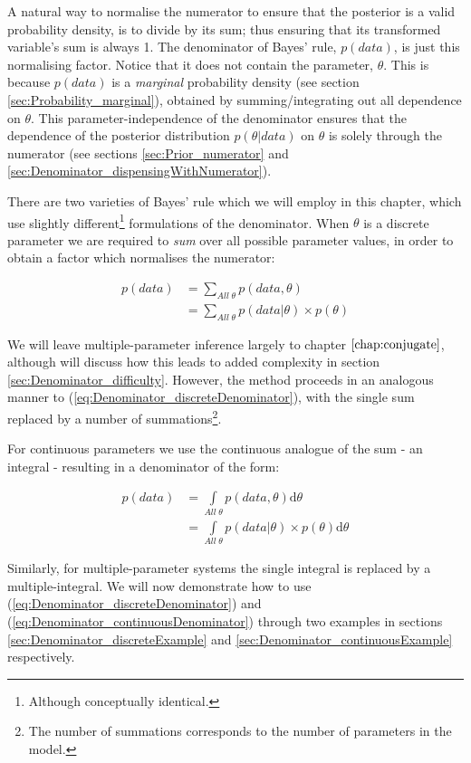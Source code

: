 \documentclass[11pt,fullpage]{book}
\begin{document}
A natural way to normalise the numerator to ensure that the posterior is a valid probability density, is to divide by its sum; thus ensuring that its transformed variable's sum is always 1. The denominator of Bayes' rule, $p(data)$, is just this normalising factor. Notice that it does not contain the parameter, $\theta$. This is because $p(data)$ is a \textit{marginal} probability density (see section \ref{sec:Probability_marginal}), obtained by summing/integrating out all dependence on $\theta$. This parameter-independence of the denominator ensures that the dependence of the posterior distribution $p(\theta|data)$ on $\theta$ is solely through the numerator (see sections \ref{sec:Prior_numerator} and \ref{sec:Denominator_dispensingWithNumerator}). 

There are two varieties of Bayes' rule which we will employ in this chapter, which use slightly different\footnote{Although conceptually identical.} formulations of the denominator. When $\theta$ is a discrete parameter we are required to \textit{sum} over all possible parameter values, in order to obtain a factor which normalises the numerator:

\begin{align}\label{eq:Denominator_discreteDenominator}
p(data) &= \sum\limits_{All\;\theta} p(data,\theta)\\ 
&= \sum\limits_{All\;\theta} p(data|\theta) \times p(\theta)
\end{align}

We will leave multiple-parameter inference largely to chapter $\ref{chap:conjugate}$, although will discuss how this leads to added complexity in section \ref{sec:Denominator_difficulty}. However, the method proceeds in an analogous manner to (\ref{eq:Denominator_discreteDenominator}), with the single sum replaced by a number of summations\footnote{The number of summations corresponds to the number of parameters in the model.}.

For continuous parameters we use the continuous analogue of the sum - an integral - resulting in a denominator of the form:

\begin{align}\label{eq:Denominator_continuousDenominator}
p(data) &= \int\limits_{All\;\theta} p(data,\theta) \mathrm{d}\theta\\
&= \int\limits_{All\;\theta} p(data|\theta) \times p(\theta) \mathrm{d}\theta
\end{align}

Similarly, for multiple-parameter systems the single integral is replaced by a multiple-integral. We will now demonstrate how to use (\ref{eq:Denominator_discreteDenominator}) and (\ref{eq:Denominator_continuousDenominator}) through two examples in sections \ref{sec:Denominator_discreteExample} and \ref{sec:Denominator_continuousExample} respectively.
\end{document}
